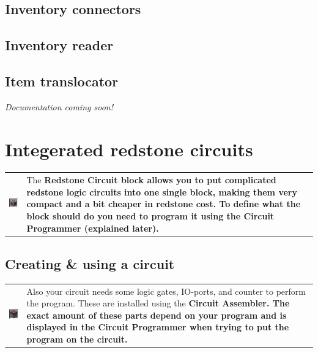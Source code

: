 \documentclass[11pt]{article} %
\makeatletter
\newcommand{\imgtex}{\begin{tabularx}{\textwidth}{@{}c@{ }X@{}}}
\makeatother
\begin{document}
\subsection{Inventory connectors}
\subsection{Inventory reader}
\subsection{Item translocator}
\it Documentation coming soon!\rm

\section{Integerated redstone circuits}
\imgtex
\includegraphics[align = t]{circuit} & The \bf Redstone Circuit \rm block allows you to put complicated redstone logic circuits into one single block, making them very compact and a bit cheaper in redstone cost. To define what the block should do you need to program it using the \bf Circuit Programmer \rm (explained later).\\
\end{tabularx}

\subsection{Creating \& using a circuit}
\imgtex
\includegraphics[align = t]{assembler} & Also your circuit needs some logic gates, IO-ports, and counter to perform the program. These are installed using the \bf Circuit Assembler\rm .
The exact amount of these parts depend on your program and is displayed in the Circuit Programmer when trying to put the program on the circuit.\\
\end{tabularx}
\end{document}
